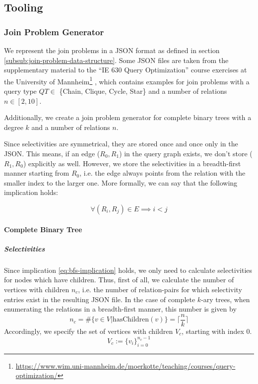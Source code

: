 \subsection{Tooling}

\subsubsection{Join Problem Generator}
We represent the join problems in a JSON format as defined in section \ref{subsub:join-problem-data-structure}. 
Some JSON files are taken from the supplementary material to the ``IE 630 Query Optimization'' course exercises at the University of Mannheim\footnote{\url{https://www.wim.uni-mannheim.de/moerkotte/teaching/courses/query-optimization/}}
, which contains examples for join problems with a query type $QT \in $ \{Chain, Clique, Cycle, Star\} and a number of relations $n \in [2,10]$.

Additionally, we create a join problem generator for complete binary trees with a degree $k$ and a number of relations $n$.

Since selectivities are symmetrical, they are stored once and once only in the JSON. This means, if an edge ($R_0, R_1$) in the query graph exists, we don't store ($R_1, R_0$) explicitly as well. However, we store the selectivities in a breadth-first manner starting from $R_0$, i.e. the edge always points from the relation with the smaller index to the larger one. More formally, we can say that the following implication holds:

\begin{equation}
    \forall (R_i, R_j) \in E \implies i < j
\label{eq:bfs-implication}
\end{equation}

\setlength{\belowdisplayskip}{10pt}
\setlength{\belowdisplayshortskip}{50pt}
\setlength{\abovedisplayskip}{10pt}
\setlength{\abovedisplayshortskip}{10pt}

\paragraph{Complete Binary Tree}
\subparagraph{Selectivities}
Since implication \ref{eq:bfs-implication} holds, we only need to calculate selectivities for nodes which have children.
Thus, first of all, we calculate the number of vertices with children $n_c$, i.e. the number of relation-pairs for which selectivity entries exist in the resulting JSON file.
In the case of complete $k$-ary trees, when enumerating the relations in a breadth-first manner, this number is given by 
\begin{equation}
    n_{c} = \#\{v \in V \vert \text{hasChildren}(v)\} = \lceil\frac{n}{k}\rceil
\end{equation}
Accordingly, we specify the set of vertices with children $V_c$, starting with index 0.
\begin{equation}
   V_c := \{v_i\}_{i=0}^{n_{c}-1}
\end{equation} 

